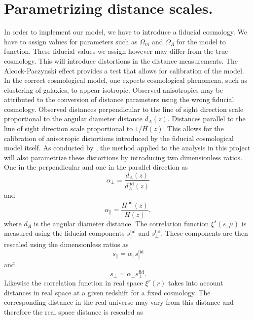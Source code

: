 \section{Parametrizing distance scales.}\label{sec:rescale_r}
In order to implement our model, we have to introduce a fiducial cosmology. We have to assign values for parameters such as $\Omega_m$ and $\Omega_\Lambda$ for the model to function. These fiducial values we assign however may differ from the true cosmology. This will introduce distortions in the distance measurements. The Alcock-Paczynski effect\cite{Alcockpaczynski} provides a test that allows for calibration of the model. In the correct cosmological model, one expects cosmological phenomena, such as clustering of galaxies, to appear isotropic. Observed anisotropies may be attributed to the conversion of distance parameters using the wrong fiducial cosmology. Observed distances perpendicular to the line of sight direction scale proportional to the angular diameter distance $d_A(z)$. Distances parallel to the line of sight direction scale proportional to $1/H(z)$. This allows for the calibration of anisotropic distortions introduced by the fiducial cosmological model itself. As conducted by \cite{BeyondBAO}, the method applied to the analysis in this project will also parametrize these distortions by introducing two dimensionless ratios. One in the perpendicular and one in the parallel direction as
\begin{equation}\label{eq:alpha_perp}
    \alpha_\perp=\frac{d_A(z)}{d_A^{\mathrm{fid}}(z)}
\end{equation} 
and
\begin{equation}\label{eq:alpha_par}
    \alpha_\parallel=\frac{H^{\mathrm{fid}}(z)}{H(z)},
\end{equation}
where $d_A$ is the angular diameter distance. The correlation function $\xi^s(s,\mu)$ is measured using the fiducial
components $s_\parallel^\mathrm{fid}$ and $s_\perp^\mathrm{fid}$. These components are then rescaled using the dimensionless ratios as
\begin{equation}
    s_\parallel=\alpha_\parallel s_\parallel^\mathrm{fid}
\end{equation}
and 
\begin{equation}
    s_\perp = \alpha_\perp s_\perp^\mathrm{fid}.
\end{equation}
Likewise the correlation function in real space $\xi^r(r)$ takes into account distances in real space at a given redshift for a fixed cosmology. The corresponding distance in the real universe may vary from this distance and therefore the real space distance is rescaled as
